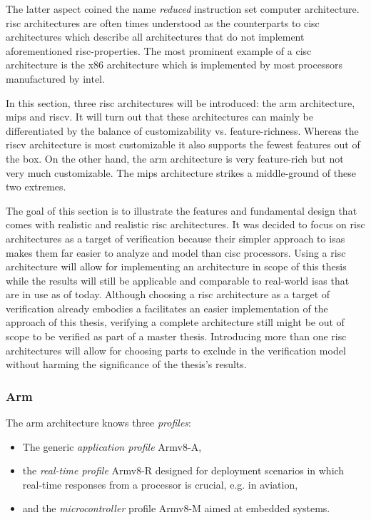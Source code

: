 The latter aspect coined the name \textit{reduced} instruction set computer architecture.
\gls{risc} architectures are often times understood as the counterparts to \gls{cisc} architectures which describe all architectures that do not implement aforementioned \gls{risc}-properties.
The most prominent example of a \gls{cisc} architecture is the \gls{x86} architecture which is implemented by most processors manufactured by intel.

In this section, three \gls{risc} architectures will be introduced: the \gls{arm} architecture, \gls{mips} and \gls{riscv}.
It will turn out that these architectures can mainly be differentiated by the balance of customizability vs. feature-richness.
Whereas the \gls{riscv} architecture is most customizable it also supports the fewest features out of the box.
On the other hand, the \gls{arm} architecture is very feature-rich but not very much customizable.
The \gls{mips} architecture strikes a middle-ground of these two extremes.

The goal of this section is to illustrate the features and fundamental design that comes with realistic and realistic \gls{risc} architectures.
It was decided to focus on \gls{risc} architectures as a target of verification because their simpler approach to \glspl{isa} makes them far easier to analyze and model than \gls{cisc} processors.
Using a \gls{risc} architecture will allow for implementing an architecture in scope of this thesis while the results will still be applicable and comparable to real-world \glspl{isa} that are in use as of today.
Although choosing a \gls{risc} architecture as a target of verification already embodies a facilitates an easier implementation of the approach of this thesis, verifying a complete architecture still might be out of scope to be verified as part of a master thesis.
Introducing more than one \gls{risc} architectures will allow for choosing parts to exclude in the verification model without harming the significance of the thesis's results.

\subsubsection{Arm}

The \gls{arm} architecture knows three \textit{profiles}:
\begin{itemize}
    \item The generic \textit{application profile} Armv8-A,
    \item the \textit{real-time profile} Armv8-R designed for deployment scenarios in which real-time responses from a processor is crucial, e.g. in aviation,
    \item and the \textit{microcontroller} profile Armv8-M aimed at embedded systems.
\end{itemize}

